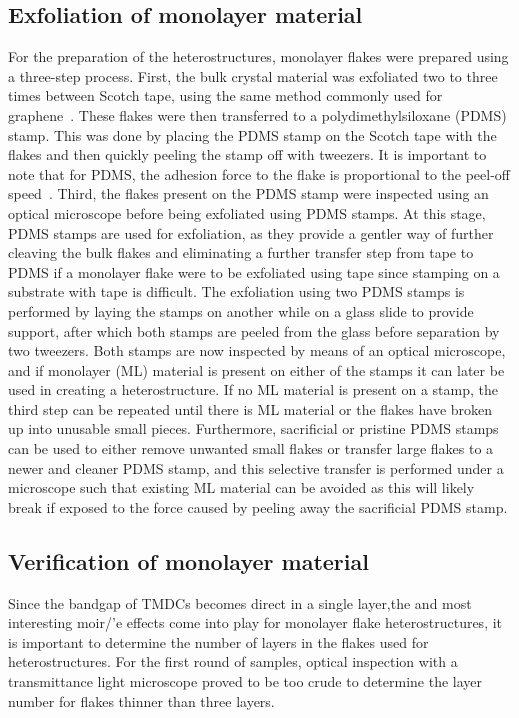 \subsection{Exfoliation of monolayer material}
%
For the preparation of the heterostructures, monolayer flakes were prepared using a three-step process.
%
First, the bulk crystal material was exfoliated two to three times between Scotch tape, using the same method commonly used for graphene~\cite{novoselovRoomTemperatureQuantumHall2007}. 
%
These flakes were then transferred to a polydimethylsiloxane (PDMS) stamp.
%
This was done by placing the PDMS stamp on the Scotch tape with the flakes and then quickly peeling the stamp off with tweezers. 
%
It is important to note that for PDMS, the adhesion force to the flake is proportional to the peel-off speed~\cite{kusakaMicrocontactPatterningConductive2015}.
%
Third, the flakes present on the PDMS stamp were inspected using an optical microscope before being exfoliated using PDMS stamps. At this stage, PDMS stamps are used for exfoliation, as they provide a gentler way of further cleaving the bulk flakes and eliminating a further transfer step from tape to PDMS if a monolayer flake were to be exfoliated using tape since stamping on a substrate with tape is difficult. The exfoliation using two PDMS stamps is performed by laying the stamps on another while on a glass slide to provide support, after which both stamps are peeled from the glass before separation by two tweezers. Both stamps are now inspected by means of an optical microscope, and if monolayer (ML) material is present on either of the stamps it can later be used in creating a heterostructure.
If no ML material is present on a stamp, the third step can be repeated until there is ML material or the flakes have broken up into unusable small pieces.
Furthermore, sacrificial or pristine PDMS stamps can be used to either remove unwanted small flakes or transfer large flakes to a newer and cleaner PDMS stamp, and this selective transfer is performed under a microscope such that existing ML material can be avoided as this will likely break if exposed to the force caused by peeling away the sacrificial PDMS stamp.

\subsection{Verification of monolayer material}

Since the bandgap of TMDCs becomes direct in a single layer,the  and most interesting moir/'e effects come into play for monolayer flake heterostructures, it is important to determine the number of layers in the flakes used for heterostructures. 
For the first round of samples, optical inspection with a transmittance light microscope proved to be too crude to determine the layer number for flakes thinner than three layers.

